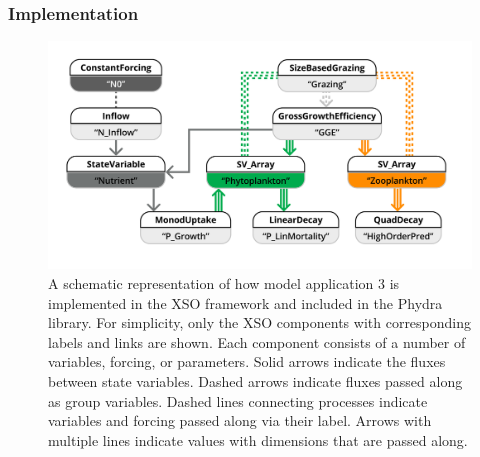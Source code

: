 \documentclass[journal abbreviation, manuscript]{copernicus}
\begin{document}
\subsubsection{Implementation}
\begin{figure}[t]
\includegraphics[width=15cm]{Figures/firstdraft_schematics/code_schematics/ASTroCAT.pdf}
\caption{A schematic representation of how model application 3 is implemented in the XSO framework and included in the Phydra library. For simplicity, only the XSO components with corresponding labels and links are shown. Each component consists of a number of variables, forcing, or parameters. Solid arrows indicate the fluxes between state variables. Dashed arrows indicate fluxes passed along as group variables. Dashed lines connecting processes indicate variables and forcing passed along via their label. Arrows with multiple lines indicate values with dimensions that are passed along.}
\label{Figure:CodeSchematics_3}
\end{figure}
\end{document}
